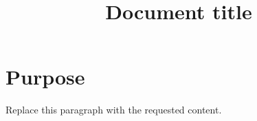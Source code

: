 \documentclass[11pt]{article}
\title{Document title}
\author{}
\date{}
\begin{document}
\maketitle
\section{Purpose}
Replace this paragraph with the requested content.
\end{document}
